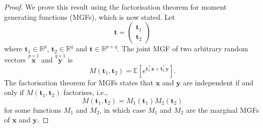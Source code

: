 \documentclass[]{book}
\theoremstyle{definition}
\theoremstyle{definition}
\theoremstyle{definition}
\theoremstyle{remark}
\begin{document}
\begin{proof}
{}We prove this result using the factorisation theorem for moment generating functions (MGFs), which is now stated.
Let
\[{\boldsymbol t}=\begin{pmatrix}{\boldsymbol t}_1\\ {\boldsymbol t}_2\end{pmatrix}\]
where \({\boldsymbol t}_1 \in \mathbb{R}^p\), \({\boldsymbol t}_2 \in \mathbb{R}^q\) and \({\boldsymbol t}\in \mathbb{R}^{p+q}\). The joint MGF of two arbitrary random vectors \(\stackrel{p \times 1}{\boldsymbol x}\) and \(\stackrel{q \times 1}{\boldsymbol y}\) is \[
 M({\boldsymbol t}_1, {\boldsymbol t}_2)={\mathbb{E}}[e^{{\boldsymbol t}_1^\top \boldsymbol x+ {\boldsymbol t}_2^\top \boldsymbol y}].
  \]
The factorisation theorem for MGFs states that
\(\boldsymbol x\) and \(\boldsymbol y\) are independent if and only if \(M({\boldsymbol t}_1 , {\boldsymbol t}_2)\) factorises, i.e.,
\[
M({\boldsymbol t}_1 , {\boldsymbol t}_2)=M_1({\boldsymbol t}_1)M_2({\boldsymbol t}_2)
\]
for some functions \(M_1\) and \(M_2\), in which case \(M_1\) and \(M_2\) are the marginal MGFs of \(\boldsymbol x\) and \(\boldsymbol y\).


\end{proof}
\end{document}
